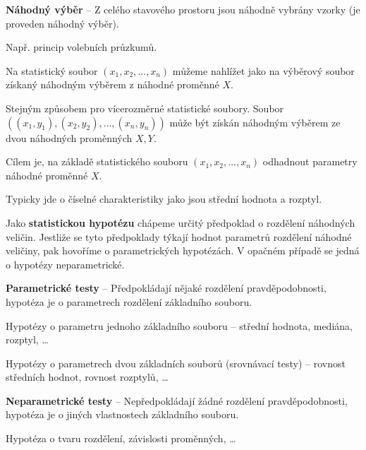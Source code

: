 \begin{compactitem}
    \item \textbf{Náhodný výběr} -- Z celého stavového prostoru jsou náhodně vybrány vzorky (je proveden náhodný výběr). \begin{compactitem}
        Např. princip volebních průzkumů.
    \end{compactitem}

    \item Na statistický soubor $(x_1, x_2, \ldots, x_n)$ můžeme nahlížet jako na výběrový soubor získaný náhodným výběrem z náhodné proměnné $X$. \begin{compactitem}
        \item Stejným způsobem pro vícerozměrné statistické soubory. Soubor\break $((x_1, y_1), (x_2, y_2), \ldots, (x_n, y_n))$ může být získán náhodným výběrem ze dvou náhodných proměnných $X, Y$.
    \end{compactitem}

    \item Cílem je, na základě statistického souboru $(x_1, x_2, \ldots, x_n)$ odhadnout parametry náhodné proměnné $X$. \begin{compactitem}
        \item Typicky jde o číselné charakteristiky jako jsou střední hodnota a rozptyl.
    \end{compactitem}

    \item Jako \textbf{statistickou hypotézu} chápeme určitý předpoklad o rozdělení náhodných veličin. Jestliže se tyto předpoklady týkají hodnot parametrů rozdělení náhodné veličiny, pak hovoříme o parametrických hypotézách. V opačném případě se jedná o hypotézy neparametrické.

    \item \textbf{Parametrické testy} -- Předpokládají nějaké rozdělení pravděpodobnosti, hypotéza je o parametrech rozdělení základního souboru. \begin{compactitem}

        \item Hypotézy o parametru jednoho základního souboru -- střední hodnota, mediána, rozptyl, \dots
        \item Hypotézy o parametrech dvou základních souborů
        (srovnávací testy) -- rovnost středních hodnot, rovnost
        rozptylů, \dots
    \end{compactitem}

    \item \textbf{Neparametrické testy} -- Nepředpokládají žádné rozdělení pravděpodobnosti, hypotéza je o jiných vlastnostech základního souboru. \begin{compactitem}
        \item Hypotéza o tvaru rozdělení, závislosti proměnných, \dots
    \end{compactitem}

\end{compactitem}

